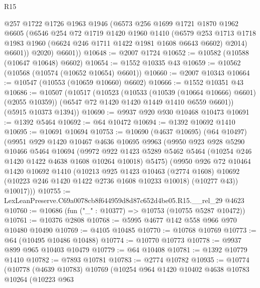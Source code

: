\begin{lexlean}{R15}
\begin{coremodule}
          @257
          @1722
          @1726
          @1963
          @1946
          (@6573
            @256
            @1699
            @1721
            @1870
            @1962
            @6605
            (@6546
              @254
              @72
              @1719
              @1420
              @1960
              @1410
              (@6579
                @253
                @1713
                @1718
                @1983
                @1960
                (@6624 @246 @1711 @1422 @1981 @1608 @6643 @6602)
                @2014)
              @6601))
          @2020)
        @6601))
@10648 := @2007 @1724
@10652 := @10582 (@10588 (@10647 @10648) @6602)
@10654 := @1552 @10335 @43
@10659 := @10562 (@10568 (@10574 (@10652 @10654) @6601))
@10660 := @2007 @10343
@10664 := @10547 (@10553 (@10659 @10660) @6602)
@10666 := @1552 @10351 @43
@10686 := @10507
    (@10517
      (@10523
        (@10533 (@10539 (@10664 @10666) @6601) (@2055 @10359))
        (@6547 @72 @1420 @1420 @1449 @1410 @6559 @6601))
      (@5915 @10373 @1394))
@10690 := @9937 @920 @930 @10468 @10473
@10691 := @1392 @5464
@10692 := @64 @10472
@10694 := @1392 @10692 @1410
@10695 := @10691 @10694
@10753 := @10690
    (@4637 @10695)
    (@64 @10497)
    (@9951
      @929
      @1420
      @10467
      @4636
      @10695
      @9963
      (@9950
        @923
        @928
        @5290
        @10466
        @5464
        @10694
        (@9972
          @922
          @1423
          @5289
          @5462
          @5464
          (@10254 @246 @1420 @1422 @4638 @1608 @10264 @10018)
          @5475)
        (@9950
          @926
          @72
          @10464
          @1420
          @10692
          @1410
          (@10213
            @925
            @1423
            @10463
            (@2774 @1608)
            @10692
            (@10223 @246 @1420 @1422 @2736 @1608 @10233 @10018)
            (@10277 @43))
          @10017)))
@10755 := LexLeanPreserve.C69a0078cb8f644959d8d87c652d4be05.R15.__rel_29 @4623
@10760 := @10686 (fun ("_" : @10377) => @10753 (@10755 @5287 @10472))
@10761 := @10376 @2808
@10768 := @5995 @4677 @142 @558 @966 @970 @10480 @10490
@10769 := @4105 @10485
@10770 := @10768 @10769
@10773 := @64 (@10495 @10486 @10488)
@10774 := @10770 @10773
@10778 := @9937 @899 @965 @10403 @10479
@10779 := @64 @10408
@10781 := @1392 @10779 @1410
@10782 := @7893 @10781
@10783 := @2774 @10782
@10935 := @10774
    (@10778
      (@4639 @10783)
      @10769
      (@10254
        @964
        @1420
        @10402
        @4638
        @10783
        @10264
        (@10223
          @963

\end{coremodule}
\end{lexlean}
